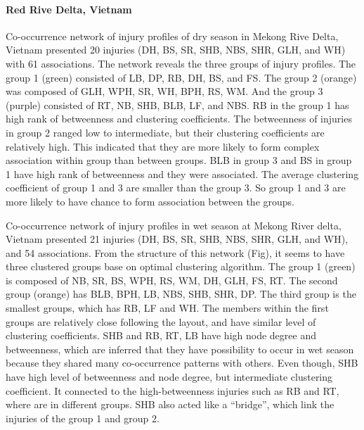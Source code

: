 \paragraph{Red Rive Delta, Vietnam}

Co-occurrence network of injury profiles of dry season in Mekong Rive Delta, Vietnam presented 20 injuries (DH, BS, SR, SHB, NBS, SHR, GLH, and WH) with 61 associations. The network reveals the three groups of injury profiles. The group 1 (green) consisted of LB, DP, RB, DH, BS, and FS. The group 2 (orange) was composed of GLH, WPH, SR, WH, BPH, RS, WM. And the group 3 (purple) consisted of RT, NB, SHB, BLB, LF, and NBS. RB in the group 1 has high rank of betweenness and clustering coefficients. The betweenness of injuries in group 2 ranged low to intermediate, but their clustering coefficients are relatively high. This indicated that they are more likely to form complex association within group than between groups. BLB in group 3 and BS in group 1 have high rank of betweenness and they were associated. The average clustering coefficient of group 1 and 3 are smaller than the group 3. So group 1 and 3 are more likely to have chance to form association between the groups.

Co-occurrence network of injury profiles in wet season at Mekong River delta, Vietnam presented 21 injuries (DH, BS, SR, SHB, NBS, SHR, GLH, and WH), and 54 associations. From the structure of this network (Fig), it seems to have three clustered groups base on optimal clustering algorithm. The group 1 (green) is composed of NB, SR, BS, WPH, RS, WM, DH, GLH, FS, RT. The second group (orange) has BLB, BPH, LB, NBS, SHB, SHR, DP. The third group is the smallest groups, which has RB, LF and WH. The members within the first groups are relatively close following the layout, and have similar level of clustering coefficients. SHB and RB, RT, LB have high node degree and betweenness, which are inferred that they have possibility to occur in wet season because they shared many co-occurrence patterns with others. Even though, SHB have high level of betweenness and node degree, but intermediate clustering coefficient.  It connected to the high-betweenness injuries such as RB and RT, where are in different groups. SHB also acted like a ``bridge'', which link the injuries of the group 1 and group 2.


